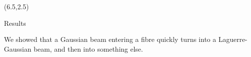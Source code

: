 \documentclass{beamer}
\newcommand{\blockpadding}{
  \rule[-0.6ex]{0pt}{2.5ex}
}
\begin{document}
\begin{textblock}{8.5}(6.5,2.5)
\begin{block}{\blockpadding Results}
We showed that a Gaussian beam entering a fibre quickly turns into a Laguerre-Gaussian beam, and then into something else. 
\end{block}
\end{textblock}
\end{document}
